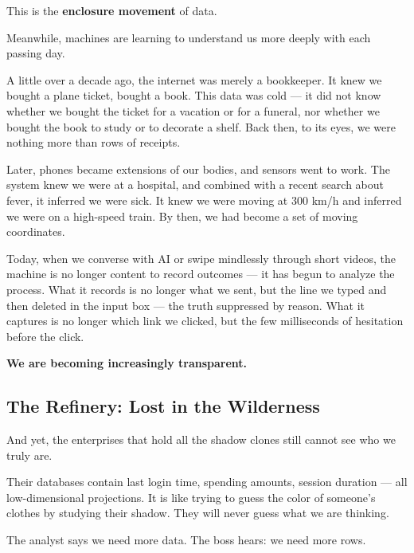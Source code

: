 This is the \textbf{enclosure movement} of data.

\vspace{1em}

Meanwhile, machines are learning to understand us more deeply with each passing day.

A little over a decade ago, the internet was merely a bookkeeper. It knew we bought a plane ticket, bought a book. This data was cold --- it did not know whether we bought the ticket for a vacation or for a funeral, nor whether we bought the book to study or to decorate a shelf. Back then, to its eyes, we were nothing more than rows of receipts.

\vspace{1em}

Later, phones became extensions of our bodies, and sensors went to work. The system knew we were at a hospital, and combined with a recent search about fever, it inferred we were sick. It knew we were moving at 300 km/h and inferred we were on a high-speed train. By then, we had become a set of moving coordinates.

\vspace{1em}

Today, when we converse with AI or swipe mindlessly through short videos, the machine is no longer content to record outcomes --- it has begun to analyze the process. What it records is no longer what we sent, but the line we typed and then deleted in the input box --- the truth suppressed by reason. What it captures is no longer which link we clicked, but the few milliseconds of hesitation before the click.

\vspace{1em}

\textbf{We are becoming increasingly transparent.}

\newpage
\subsection{The Refinery: Lost in the Wilderness}

And yet, the enterprises that hold all the shadow clones still cannot see who we truly are.

Their databases contain last login time, spending amounts, session duration --- all low-dimensional projections. It is like trying to guess the color of someone's clothes by studying their shadow. They will never guess what we are thinking.

The analyst says we need more data. The boss hears: we need more rows.

